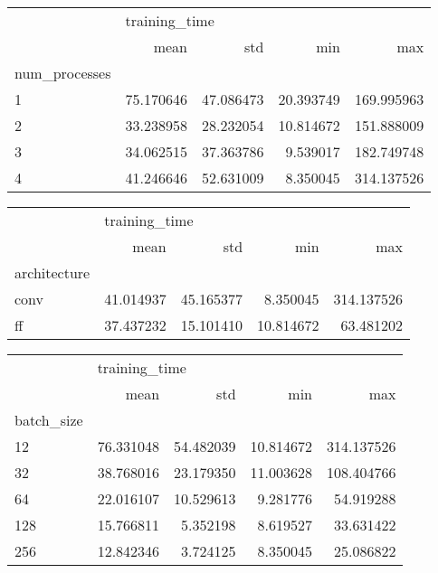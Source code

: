 \begin{tabular}{lrrrr}
\toprule
{} & \multicolumn{4}{l}{training\_time} \\
{} &          mean &        std &        min &         max \\
num\_processes &               &            &            &             \\
\midrule
1             &     75.170646 &  47.086473 &  20.393749 &  169.995963 \\
2             &     33.238958 &  28.232054 &  10.814672 &  151.888009 \\
3             &     34.062515 &  37.363786 &   9.539017 &  182.749748 \\
4             &     41.246646 &  52.631009 &   8.350045 &  314.137526 \\
\bottomrule
\end{tabular}
\begin{tabular}{lrrrr}
\toprule
{} & \multicolumn{4}{l}{training\_time} \\
{} &          mean &        std &        min &         max \\
architecture &               &            &            &             \\
\midrule
conv         &     41.014937 &  45.165377 &   8.350045 &  314.137526 \\
ff           &     37.437232 &  15.101410 &  10.814672 &   63.481202 \\
\bottomrule
\end{tabular}
\begin{tabular}{lrrrr}
\toprule
{} & \multicolumn{4}{l}{training\_time} \\
{} &          mean &        std &        min &         max \\
batch\_size &               &            &            &             \\
\midrule
12         &     76.331048 &  54.482039 &  10.814672 &  314.137526 \\
32         &     38.768016 &  23.179350 &  11.003628 &  108.404766 \\
64         &     22.016107 &  10.529613 &   9.281776 &   54.919288 \\
128        &     15.766811 &   5.352198 &   8.619527 &   33.631422 \\
256        &     12.842346 &   3.724125 &   8.350045 &   25.086822 \\
\bottomrule
\end{tabular}
